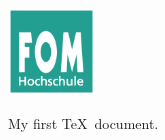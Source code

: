 \documentclass[11pt]{scrartcl}
\begin{document}
\includegraphics[width=2.3cm]{assets/fomLogo}

My first \TeX~document. 

\end{document}
